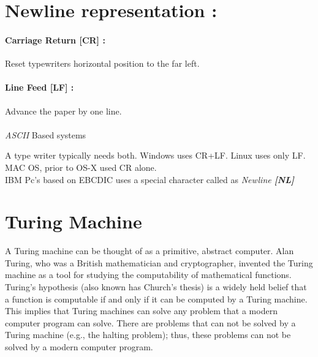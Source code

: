 \documentclass[12pt]{article}
\begin{document}
\section{Newline representation  : }

\paragraph{Carriage Return [CR] : } Reset typewriters horizontal position to the far left.
\paragraph{Line Feed [LF] : } Advance the paper by one line.
\\
\\
\textit{ASCII }Based systems 

A type writer typically needs both.
Windows uses CR+LF.
Linux uses only LF.
MAC OS, prior to OS-X used CR alone.
\\

IBM Pc's based on EBCDIC uses a special character called as \textit{Newline \textbf{[NL]}}
\pagebreak

\section{Turing Machine}

A Turing machine can be thought of as a primitive, abstract computer. Alan Turing, who was a British mathematician and cryptographer, invented the Turing machine as a tool for studying the computability of mathematical functions. Turing's hypothesis (also known has Church's thesis) is a widely held belief that a function is computable if and only if it can be computed by a Turing machine. This implies that Turing machines can solve any problem that a modern computer program can solve. There are problems that can not be solved by a Turing machine (e.g., the halting problem); thus, these problems can not be solved by a modern computer program.
\end{document}

